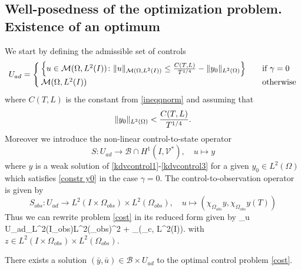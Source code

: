 \subsection{Well-posedness of the optimization problem. Existence of an optimum}
We start by defining the admissible set of controls
$$U_{ad} = \begin{cases} \left\{u \in \mathcal{M}(\Omega, L^{2}(I))\colon \lVert u\rVert_{\mathcal{M}(\Omega, L^{2}(I))} \leq \frac{C(T,L)}{T^{1/4}}-\lVert y_0\rVert_{L^2(\Omega)}\right\} &\quad\mbox{if } \gamma = 0 \\
\mathcal{M}(\Omega, L^{2}(I)) & \quad \mbox{otherwise}
 \end{cases}$$
where $C(T,L)$ is the constant from \eqref{ineqqnorm} and assuming that
\begin{equation}\label{constr y0}
\lVert y_0\rVert_{L^2(\Omega)}< \frac{C(T,L)}{T^{1/4}}.
\end{equation}
Moreover we introduce the non-linear control-to-state operator
\begin{equation}
 S\colon U_{ad}\rightarrow \mathcal B\cap H^1(I,\mathcal V^\ast),\quad u\mapsto y
 \label{controltostate}
\end{equation}
where $y$ is a weak solution of \eqref{kdvcontrol1}-\eqref{kdvcontrol3} for a given $y_0\in L^2(\Omega)$ which satisfies
\eqref{constr y0} in the case $\gamma =0$. The control-to-observation operator is given by
\[
S_{obs}\colon U_{ad}\rightarrow L^2(I\times \Omega_{obs})\times L^2(\Omega_{obs}),\quad u\mapsto(\chi_{\Omega_{obs}}y,\chi_{\Omega_{obs}}y(T))
\]
Thus we can rewrite problem \eqref{cost} in its reduced form given by
\be
\min_{u \in U_{ad}}_{L^2(I\times \Omega_{obs})\times L^2(\Omega_{obs})}^2 + \alpha {}_{(\Omega_{c}, L^{2}(I))}.
\label{red cost}
\ee
with $z\in L^2(I\times \Omega_{obs})\times L^2(\Omega_{obs})$.
\begin{prop}
There exists a solution $(\bar y,\bar u) \in \mathcal B\times U_{ad}$ to the optimal control problem \eqref{cost}.
\end{prop}
